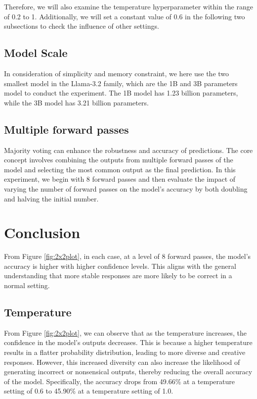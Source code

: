\documentclass[
	a4paper, %
	10pt, %
	twoside, %
]{LTJournalArticle}
\begin{document}
Therefore, we will also examine the temperature hyperparameter within the range of 0.2 to 1. Additionally, we will set a constant value of 0.6 in the following two subsections to check the influence of other settings.

\subsection{Model Scale}

In consideration of simplicity and memory constraint, we here use the two smallest model in the Llama-3.2 family, which are the 1B and 3B parameters model to conduct the experiment. The 1B model has 1.23 billion parameters, while the 3B model has 3.21 billion parameters.\autocite{huggingfaceLlama-3.2-1B-Instruct}

\subsection{Multiple forward passes}

Majority voting can enhance the robustness and accuracy of predictions. The core concept involves combining the outputs from multiple forward passes of the model and selecting the most common output as the final prediction. In this experiment, we begin with 8 forward passes and then evaluate the impact of varying the number of forward passes on the model's accuracy by both doubling and halving the initial number.


\section{Conclusion}

From Figure \ref{fig:2x2plot}, in each case, at a level of 8 forward passes, the model's accuracy is higher with higher confidence levels. This aligns with the general understanding that more stable responses are more likely to be correct in a normal setting.

\subsection{Temperature}

From Figure \ref{fig:2x2plot}, we can observe that as the temperature increases, the confidence in the model's outputs decreases. This is because a higher temperature results in a flatter probability distribution, leading to more diverse and creative responses. However, this increased diversity can also increase the likelihood of generating incorrect or nonsensical outputs, thereby reducing the overall accuracy of the model. Specifically, the accuracy drops from 49.66\% at a temperature setting of 0.6 to 45.90\% at a temperature setting of 1.0.
\end{document}
